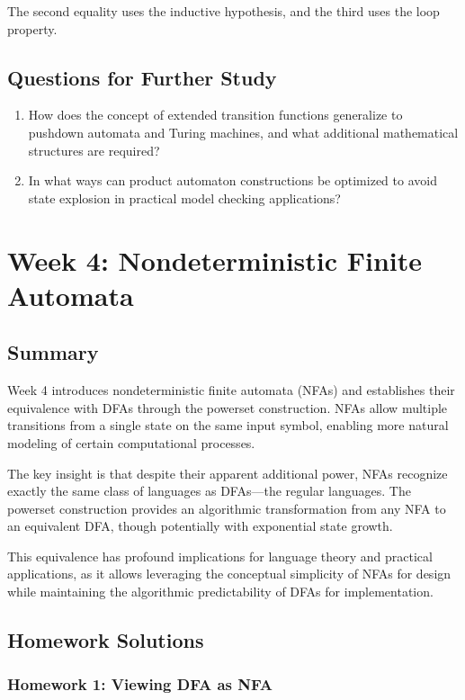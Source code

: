 \documentclass{article}
\begin{document}
The second equality uses the inductive hypothesis, and the third uses the loop property.

\subsection{Questions for Further Study}
\begin{enumerate}
    \item How does the concept of extended transition functions generalize to pushdown automata and Turing machines, and what additional mathematical structures are required?
    
    \item In what ways can product automaton constructions be optimized to avoid state explosion in practical model checking applications?
\end{enumerate}

\section{Week 4: Nondeterministic Finite Automata}

\subsection{Summary}
Week 4 introduces nondeterministic finite automata (NFAs) and establishes their equivalence with DFAs through the powerset construction. NFAs allow multiple transitions from a single state on the same input symbol, enabling more natural modeling of certain computational processes.

The key insight is that despite their apparent additional power, NFAs recognize exactly the same class of languages as DFAs—the regular languages. The powerset construction provides an algorithmic transformation from any NFA to an equivalent DFA, though potentially with exponential state growth.

This equivalence has profound implications for language theory and practical applications, as it allows leveraging the conceptual simplicity of NFAs for design while maintaining the algorithmic predictability of DFAs for implementation.

\subsection{Homework Solutions}

\subsubsection{Homework 1: Viewing DFA as NFA}
\end{document}
